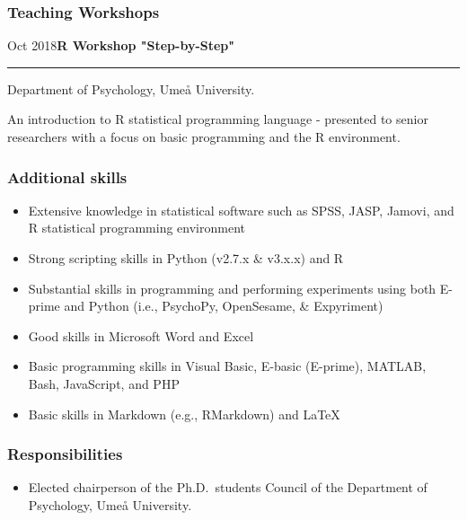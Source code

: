 \documentclass[]{article}
\providecommand{\tightlist}{%
  \setlength{\itemsep}{0pt}\setlength{\parskip}{0pt}}
\begin{document}
\hypertarget{teaching-workshops}{%
\subsubsection{Teaching Workshops}\label{teaching-workshops}}

Oct 2018\hspace{0.75cm}\textbf{R Workshop "Step-by-Step"}\vspace{1mm}

\hrule
\begin{changemargin}{2.15cm}{2.4cm}

Department of Psychology, Umeå University.

An introduction to R statistical programming language - presented to senior researchers with a focus on basic programming and the R environment.

\end{changemargin}

\hypertarget{additional-skills}{%
\subsubsection{Additional skills}\label{additional-skills}}

\begin{itemize}
\tightlist
\item
  Extensive knowledge in statistical software such as SPSS, JASP,
  Jamovi, and R statistical programming environment
\item
  Strong scripting skills in Python (v2.7.x \& v3.x.x) and R
\item
  Substantial skills in programming and performing experiments using
  both E-prime and Python (i.e., PsychoPy, OpenSesame, \& Expyriment)
\item
  Good skills in Microsoft Word and Excel
\item
  Basic programming skills in Visual Basic, E-basic (E-prime), MATLAB,
  Bash, JavaScript, and PHP
\item
  Basic skills in Markdown (e.g., RMarkdown) and \LaTeX
\end{itemize}

\hypertarget{responsibilities}{%
\subsubsection{Responsibilities}\label{responsibilities}}

\begin{itemize}
\tightlist
\item
  Elected chairperson of the Ph.D.~students Council of the Department of
  Psychology, Umeå University.
\end{itemize}
\end{document}
